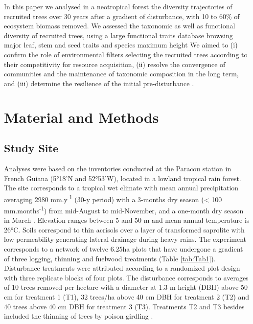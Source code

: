 \documentclass[fleqn,10pt]{ArtEcoFoG} %
\begin{document}
In this paper we analysed in a neotropical forest the diversity
trajectories of recruited trees over 30 years after a gradient of
disturbance, with 10 to 60\% of ecosystem biomass removed. We assessed
the taxonomic as well as functional diversity of recruited trees, using
a large functional traits database browsing major leaf, stem and seed
traits and species maximum height We aimed to (i) confirm the role of
environmental filters selecting the recruited trees according to their
competitivity for resource acquisition, (ii) resolve the convergence of
communities and the maintenance of taxonomic composition in the long
term, and (iii) determine the resilience of the initial pre-disturbance
.

\section{Material and Methods}\label{material-and-methods}

\subsection{Study Site}\label{study-site}

Analyses were based on the inventories conducted at the Paracou station
in French Guiana (5°18'N and 52°53'W), located in a lowland tropical
rain forest. The site corresponds to a tropical wet climate with mean
annual precipitation averaging 2980 mm.y\textsuperscript{-1} (30-y
period) with a 3-months dry season (\textless{} 100
mm.months\textsuperscript{-1}) from mid-August to mid-November, and a
one-month dry season in March \citep{Wagner2011}. Elevation ranges
between 5 and 50 m and mean annual temperature is 26°C. Soils correspond
to thin acrisols over a layer of transformed saprolite with low
permeability generating lateral drainage during heavy rains. The
experiment corresponds to a network of twelve 6.25ha plots that have
undergone a gradient of three logging, thinning and fuelwood treatments
(Table \ref{tab:Tab1}). Disturbance treatments were attributed according
to a randomized plot design with three replicate blocks of four plots.
The disturbance corresponds to averages of 10 trees removed per hectare
with a diameter at 1.3 m height (DBH) above 50 cm for treatment 1 (T1),
32 trees/ha above 40 cm DBH for treatment 2 (T2) and 40 trees above 40
cm DBH for treatment 3 (T3). Treatments T2 and T3 besides included the
thinning of trees by poison girdling \citep{Blanc2009}.
\end{document}
